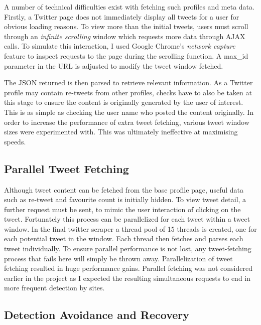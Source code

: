 A number of technical difficulties exist with fetching such profiles and meta data. Firstly, a Twitter page does not immediately display all tweets for a user for obvious loading reasons. To view more than the initial tweets, users must scroll through an \textit{infinite scrolling} window which requests more data through AJAX calls. To simulate this interaction, I used Google Chrome's \textit{network capture} feature to inspect requests to the page during the scrolling function. A max\_id parameter in the URL is adjusted to modify the tweet window fetched.

% 

The JSON returned is then parsed to retrieve relevant information. As a Twitter profile may contain re-tweets from other profiles, checks have to also be taken at this stage to ensure the content is originally generated by the user of interest. This is as simple as checking the user name who posted the content originally. In order to increase the performance of extra tweet fetching, various tweet window sizes were experimented with. This was ultimately ineffective at maximising speeds.

\subsection{Parallel Tweet Fetching}

Although tweet content can be fetched from the base profile page, useful data such as re-tweet and favourite count is initially hidden. To view tweet detail, a further request must be sent, to mimic the user interaction of clicking on the tweet. Fortunately this process can be parallelized for each tweet within a tweet window. In the final twitter scraper a thread pool of 15 threads is created, one for each potential tweet in the window. Each thread then fetches and parses each tweet individually. To ensure parallel performance is not lost, any tweet-fetching process that fails here will simply be thrown away. Parallelization of tweet fetching resulted in huge performance gains. Parallel fetching was not considered earlier in the project as I expected the resulting simultaneous requests to end in more frequent detection by sites. 

\subsection{Detection Avoidance and Recovery}

